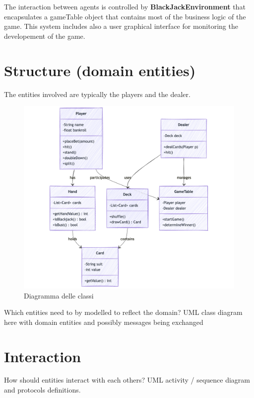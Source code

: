 The interaction between agents is controlled by \textbf{BlackJackEnvironment} that encapsulates a gameTable object that contains most of the business logic of the game. This system includes also a user graphical interface for monitoring the developement of the game.

\section{Structure (domain entities)}
The entities involved are typically the players and the dealer.

\begin{figure}[ht]
    \centering
    \includegraphics[scale=0.55]{report/img/classDiagram.png}
    \caption{Diagramma delle classi}
    \label{fig:classDiagram}
\end{figure}


Which entities need to by modelled to reflect the domain? UML class diagram here with
domain entities and possibly messages being exchanged

\section{Interaction}
How should entities interact with each others? UML activity / sequence diagram and
protocols definitions.

